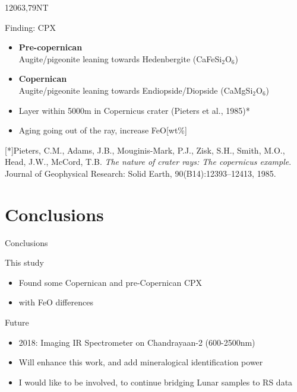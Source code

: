 \documentclass[aspectratio=169,unknownkeysallowed,xcolor=dvipsnames,beamer]{beamer} %
\begin{document}
\begin{frame}[fragile]{12063,79NT}
\begin{block}{Finding: CPX}
\begin{itemize}
\item \textbf{Pre-copernican}\\
Augite/pigeonite leaning towards Hedenbergite (CaFeSi$_2$O$_6$)
\item \textbf{Copernican}\\
Augite/pigeonite leaning towards Endiopside/Diopside (CaMgSi$_2$O$_6$)
\item Layer within 5000m in Copernicus crater (Pieters et al., 1985)*
\item Aging going out of the ray, increase FeO[wt\%]
\end{itemize}
\end{block}
[*]{\small Pieters, C.M., Adams, J.B., Mouginis-Mark, P.J., Zisk, S.H., Smith, M.O., Head, J.W., McCord, T.B. \textit{The nature of crater rays:
The copernicus example}. Journal of Geophysical Research: Solid Earth, 90(B14):12393–12413, 1985.}
\end{frame}

\section{Conclusions}
\begin{frame}[fragile]{Conclusions}
\begin{block}{This study}
\begin{itemize}
\item Found some Copernican and pre-Copernican CPX
\item with FeO differences
\end{itemize}
\end{block}
\begin{block}{Future}
\begin{itemize}
\item 2018: Imaging IR Spectrometer on Chandrayaan-2 (600-2500nm)
\item Will enhance this work, and add mineralogical identification power 
\item I would like to be involved, to continue bridging Lunar samples to RS data
\end{itemize}
\end{block}
\end{frame}
\end{document}
